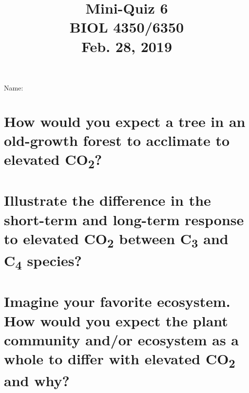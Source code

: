 \documentclass[12pt, notitlepage]{article}   	%
\title{
	\textbf{
		Mini-Quiz 6
	} \\
	\large BIOL 4350/6350 \\
	\large Feb. 28, 2019 \\
}
\date{\vspace{-5ex}}
\def\wl{\par \vspace{\baselineskip}}
\begin{document}
{\selectfont %

\large{Name:}

{\let\newpage\relax\maketitle}

\section{\small{How would you expect a tree in an old-growth forest to acclimate
to elevated CO\textsubscript{2}?}}
\wl
\wl
\wl
\wl
\wl
\wl
\wl
\wl
\wl
\wl

\section{\small{Illustrate the difference in the short-term and long-term response to 
elevated CO\textsubscript{2} between C\textsubscript{3} and C\textsubscript{4} species?}}

\newpage

\section{\small{Imagine your favorite ecosystem. How would you expect the plant community
and/or ecosystem as a whole to differ with elevated CO\textsubscript{2} and why?}}

} %
\end{document}
